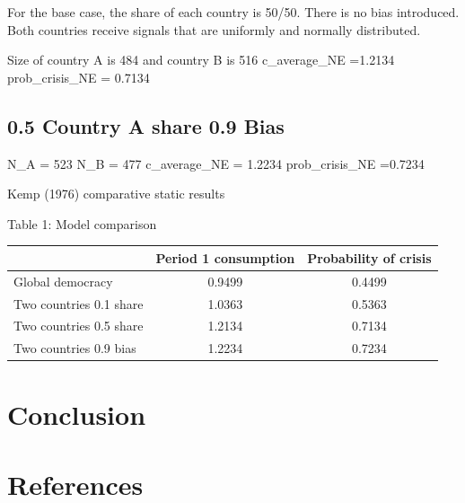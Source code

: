 \documentclass[11pt,preprint, authoryear]{elsarticle}
\numberwithin{equation}{section}
\numberwithin{figure}{section}
\numberwithin{table}{section}
\begin{document}
For the base case, the share of each country is 50/50. There is no bias
introduced. Both countries receive signals that are uniformly and
normally distributed.

Size of country A is 484 and country B is 516 c\_average\_NE =1.2134
prob\_crisis\_NE = 0.7134

\hypertarget{country-a-share-0.9-bias}{%
\subsection*{0.5 Country A share 0.9
Bias}\label{country-a-share-0.9-bias}}

N\_A = 523 N\_B = 477 c\_average\_NE = 1.2234 prob\_crisis\_NE =0.7234

Kemp (1976) comparative static results

\begin{center}
Table 1: Model comparison
\end{center}

\begin{longtable}[]{@{}lcc@{}}
\toprule()
& Period 1 consumption & Probability of crisis \\
\midrule()
\endhead
Global democracy & 0.9499 & 0.4499 \\
Two countries 0.1 share & 1.0363 & 0.5363 \\
Two countries 0.5 share & 1.2134 & 0.7134 \\
Two countries 0.9 bias & 1.2234 & 0.7234 \\
\bottomrule()
\end{longtable}

\hypertarget{conclusion}{%
\section{Conclusion}\label{conclusion}}

\newpage

\hypertarget{references}{%
\section*{References}\label{references}}


\end{document}
